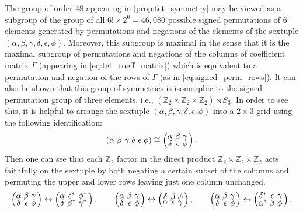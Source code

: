 \documentclass[notitlepage, 10pt]{article}
\begin{document}
\begin{rem}
    The group of order $48$ appearing in \cref{prop:tet_symmetry} may be viewed as a subgroup of the group of all $6! \times 2^6 = 46,080$ possible signed permutations of $6$ elements generated by permutations and negations of the elements of the sextuple $(\alpha,\beta,\gamma,\delta,\epsilon,\phi)$.
    Moreover, this subgroup is maximal in the sense that it is the maximal subgroup of permutations and negations of the columns of coefficient matrix $\Gamma$ (appearing in \cref{eq:tet_coeff_matrix}) which is equivalent to a permutation and negation of the rows of $\Gamma$ (as in \cref{eq:signed_perm_rows}).
    It can also be shown that this group of symmetries is isomorphic to the signed permutation group of three elements, i.e., $(\mathbb Z_2 \times \mathbb Z_2 \times \mathbb Z_2) \rtimes S_3$.
    In order to see this, it is helpful to arrange the sextuple $(\alpha,\beta,\gamma,\delta,\epsilon,\phi)$ into a $2\times 3$ grid using the following identification:
    \begin{equation}
        \left(\tightsextuple{\alpha & \beta & \gamma & \delta & \epsilon & \phi}\right)
        \cong 
        \left(\tightsextuple{\alpha & \beta & \gamma \\ \delta & \epsilon & \phi}\right).
    \end{equation}
    Then one can see that each $\mathbb Z_2$ factor in the direct product $\mathbb Z_2 \times \mathbb Z_2 \times \mathbb Z_2$ acts faithfully on the sextuple by both negating a certain subset of the columns and permuting the upper and lower rows leaving just one column unchanged.
    \begin{equation}
        \left(\tightsextuple{\alpha & \beta & \gamma \\ \delta & \epsilon & \phi}\right)
        \leftrightarrow
        \left(\tightsextuple{\alpha & \epsilon^* & \phi^* \\ \delta & \beta^* & \gamma^*}\right),
        \qquad
        \left(\tightsextuple{\alpha & \beta & \gamma \\ \delta & \epsilon & \phi}\right)
        \leftrightarrow
        \left(\tightsextuple{\delta & \beta & \phi \\ \alpha & \epsilon & \gamma}\right),
        \qquad
        \left(\tightsextuple{\alpha & \beta & \gamma \\ \delta & \epsilon & \phi}\right)
        \leftrightarrow
        \left(\tightsextuple{\delta^* & \epsilon & \gamma \\ \alpha^* & \beta & \phi}\right).

\end{equation}
\end{rem}
\end{document}
